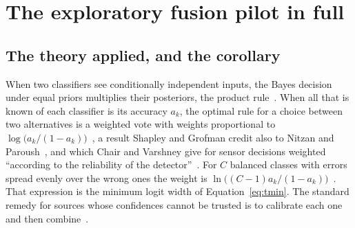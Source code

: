 \section{The exploratory fusion pilot in full}
\label{app:fusion}

\subsection{The theory applied, and the corollary}
\label{app:fusiontheory}

When two classifiers see conditionally independent inputs, the Bayes decision under equal
priors multiplies their posteriors, the product rule~\citep{kittler1998combining}. %
When all that is known of each classifier is its accuracy $a_k$, the optimal rule for a choice
between two alternatives is a weighted vote with weights proportional to
$\log\big(a_k/(1-a_k)\big)$~\citep{shapley1984optimizing}, %
a result Shapley and Grofman credit also to Nitzan and Paroush~\citep{nitzan1982optimal}, and %
which Chair and Varshney give for sensor decisions weighted ``according to the reliability of
the detector''~\citep{chair1986optimal}. %
For $C$ balanced classes with errors spread evenly over the wrong ones the weight is
$\ln\big((C-1)a_k/(1-a_k)\big)$~\citep{kuncheva2014weighted,li2014error}. %
That expression is the minimum logit width of Equation~\eqref{eq:tmin}. The standard remedy
for sources whose confidences cannot be trusted is to calibrate each one and then
combine~\citep{brummer2007fusion,kumar2022calibrated}. %

